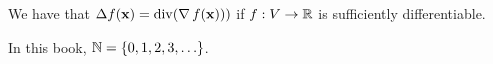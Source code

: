 We have that $\Delta f(\mathbf{x}) = \operatorname{div} (\operatorname{\nabla} f(\mathbf{x})))$
if $f:V \to \mathbb{R}$ is sufficiently differentiable.

 In this book, $\mathbb{N} = \{0,1,2,3, \ldots\}$.

